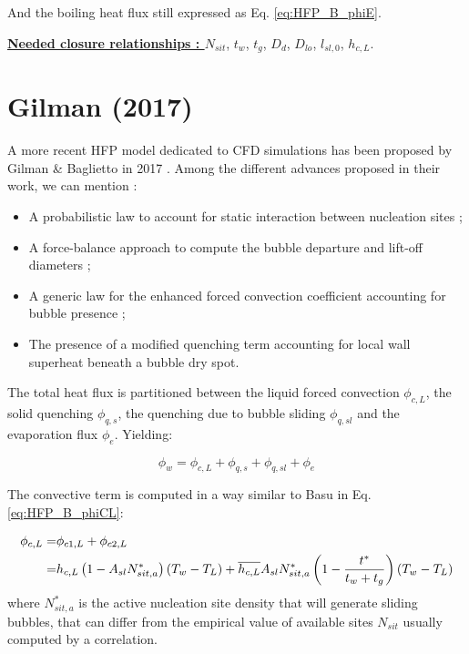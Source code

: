 And the boiling heat flux still expressed as Eq. \ref{eq:HFP_B_phiE}.

\npar


\textbf{\underline{Needed closure relationships : }} $N_{sit}$, $t_{w}$, $t_{g}$, $D_{d}$, $D_{lo}$, $l_{sl,0}$, $h_{c,L}$. 



\section{Gilman (2017)}

A more recent HFP model dedicated to CFD simulations has been proposed by Gilman \& Baglietto in 2017 \cite{gilman2017}. Among the different advances proposed in their work, we can mention :

\begin{itemize}
\item A probabilistic law to account for static interaction between nucleation sites ;
\item A force-balance approach to compute the bubble departure and lift-off diameters ;
\item A generic law for the enhanced forced convection coefficient accounting for bubble presence ; 
\item The presence of a modified quenching term accounting for local wall superheat beneath a bubble dry spot.
\end{itemize}

The total heat flux is partitioned between the liquid forced convection $\phi_{c,L}$, the solid quenching $\phi_{q,s}$, the quenching due to bubble sliding $\phi_{q,sl}$ and the evaporation flux $\phi_{e}$. Yielding:

\begin{equation}
\phi_{w} = \phi_{c,L} + \phi_{q,s} + \phi_{q,sl} + \phi_{e}
\end{equation} 

The convective term is computed in a way similar to Basu \etal \cite{basu2005} in Eq. \ref{eq:HFP_B_phiCL}:

\begin{align}
\phi_{c,L} =& \phi_{c1,L} + \phi_{c2,L}\\
% 
=&h_{c,L}\parth{1-A_{sl}N_{sit,a}^{*}}\parth{T_{w}-T_{L}} + \overline{h_{c,L}}A_{sl}N_{sit,a}^{*}\parth{1 - \frac{t^{*}}{t_{w}+t_{g}}}\parth{T_{w}-T_{L}}
\end{align}
where $N_{sit,a}^{*}$ is the active nucleation site density that will generate sliding bubbles, that can differ from the empirical value of available sites $N_{sit}$ usually computed by a correlation. 

